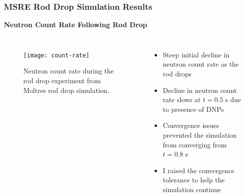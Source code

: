 \begin{frame}
  \frametitle{MSRE Rod Drop Simulation Results}
  \textbf{Neutron Count Rate Following Rod Drop}
  \begin{columns}
    \column{5.5cm}
    \begin{figure}[t]
      \centering
      \texttt{[image: count-rate]}
      \caption{Neutron count rate during the rod drop experiment from Moltres rod drop simulation.}
      \label{fig:count-rate}
    \end{figure}
    \column{5.5cm}
    \begin{itemize}
      \item Steep initial decline in neutron count rate as the rod drops
      \item Decline in neutron count rate slows at $t=0.5$ s due to presence of DNPs
      \item Convergence issues prevented the simulation from converging from $t = 0.8$ s
      \item I raised the convergence tolerance to help the simulation continue
    \end{itemize}
  \end{columns}
\end{frame}

